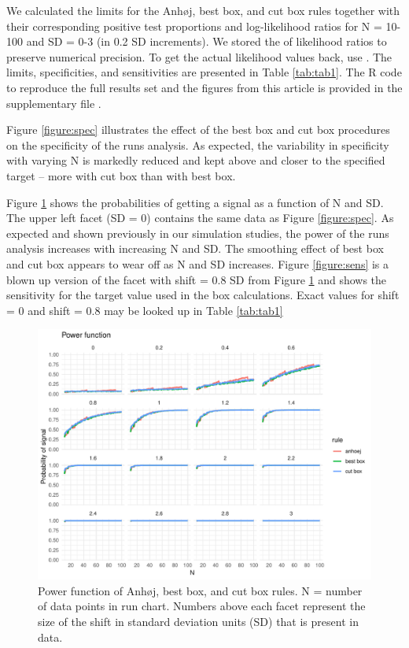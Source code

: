 We calculated the limits for the Anhøj, best box, and cut box rules
together with their corresponding positive test proportions and
log-likelihood ratios for N = 10-100 and SD = 0-3 (in 0.2 SD
increments). We stored the  of likelihood ratios to preserve
numerical precision. To get the actual likelihood values back, use
. The limits, specificities, and sensitivities
are presented in Table \ref{tab:tab1}. The R code to reproduce the full
results set and the figures from this article is provided in the
supplementary file .

Figure \ref{figure:spec} illustrates the effect of the best box and cut
box procedures on the specificity of the runs analysis. As expected, the
variability in specificity with varying N is markedly reduced and kept
above and closer to the specified target -- more with cut box than with
best box.

Figure \ref{figure:pwr} shows the probabilities of getting a signal as a
function of N and SD. The upper left facet (SD = 0) contains the same
data as Figure \ref{figure:spec}. As expected and shown previously in
our simulation studies, the power of the runs analysis increases with
increasing N and SD. The smoothing effect of best box and cut box
appears to wear off as N and SD increases. Figure \ref{figure:sens} is a
blown up version of the facet with shift = 0.8 SD from Figure
\ref{figure:pwr} and shows the sensitivity for the target value used in
the box calculations. Exact values for shift = 0 and shift = 0.8 may be
looked up in Table \ref{tab:tab1}

\begin{figure}[htbp]
  \centering
  \includegraphics[width=\textwidth]{fig_pwr.pdf}
  \caption{Power function of Anhøj, best box, and cut box rules.
           N = number of data points in run chart.
           Numbers above each facet represent the size of the shift in standard
           deviation units (SD) that is present in data.}
  \label{figure:pwr}
\end{figure}

